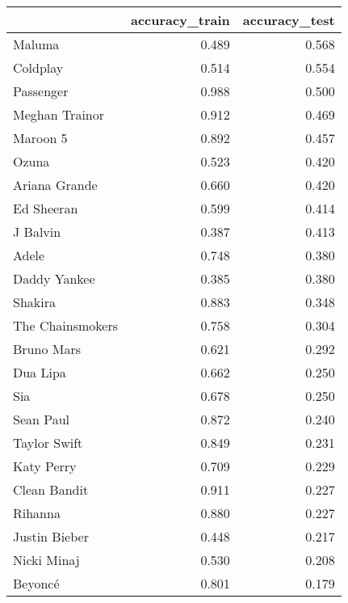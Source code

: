 \begin{tabular}{lrr}
\toprule
{} &  accuracy\_train &  accuracy\_test \\
\midrule
Maluma           &           0.489 &          0.568 \\
Coldplay         &           0.514 &          0.554 \\
Passenger        &           0.988 &          0.500 \\
Meghan Trainor   &           0.912 &          0.469 \\
Maroon 5         &           0.892 &          0.457 \\
Ozuna            &           0.523 &          0.420 \\
Ariana Grande    &           0.660 &          0.420 \\
Ed Sheeran       &           0.599 &          0.414 \\
J Balvin         &           0.387 &          0.413 \\
Adele            &           0.748 &          0.380 \\
Daddy Yankee     &           0.385 &          0.380 \\
Shakira          &           0.883 &          0.348 \\
The Chainsmokers &           0.758 &          0.304 \\
Bruno Mars       &           0.621 &          0.292 \\
Dua Lipa         &           0.662 &          0.250 \\
Sia              &           0.678 &          0.250 \\
Sean Paul        &           0.872 &          0.240 \\
Taylor Swift     &           0.849 &          0.231 \\
Katy Perry       &           0.709 &          0.229 \\
Clean Bandit     &           0.911 &          0.227 \\
Rihanna          &           0.880 &          0.227 \\
Justin Bieber    &           0.448 &          0.217 \\
Nicki Minaj      &           0.530 &          0.208 \\
Beyoncé          &           0.801 &          0.179 \\
\bottomrule
\end{tabular}
